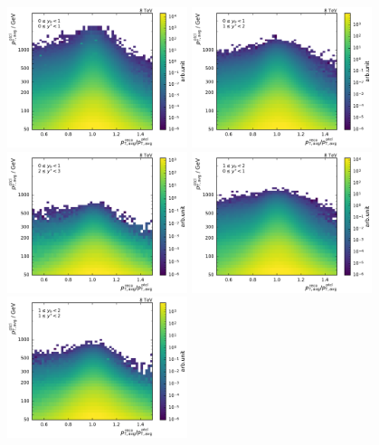 \begin{figure}[htbp]
    \centering
    \includegraphics[width=0.47\textwidth]{figures/measurement/gen_vs_reco_vs_gen_ptavg_yb0ys0.pdf}\hfill
    \includegraphics[width=0.47\textwidth]{figures/measurement/gen_vs_reco_vs_gen_ptavg_yb0ys1.pdf}
    \includegraphics[width=0.47\textwidth]{figures/measurement/gen_vs_reco_vs_gen_ptavg_yb0ys2.pdf}\hfill
    \includegraphics[width=0.47\textwidth]{figures/measurement/gen_vs_reco_vs_gen_ptavg_yb1ys0.pdf}
    \includegraphics[width=0.47\textwidth]{figures/measurement/gen_vs_reco_vs_gen_ptavg_yb1ys1.pdf}\hfill

\end{figure}
